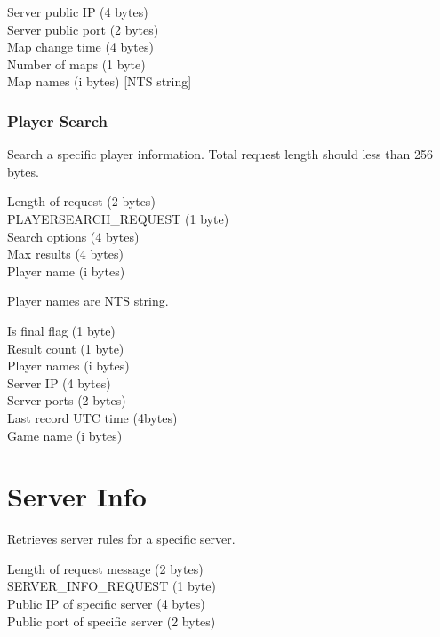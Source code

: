 \documentclass[oneside,titlepage,a4paper]{Definition/retrospy} %
\begin{document}
\ServerResponse
\begin{mybox}
	Server public IP (4 bytes)\\
	Server public port (2 bytes)\\
	Map change time (4 bytes)\\
	Number of maps (1 byte)\\
	Map names (i bytes) [NTS string]
\end{mybox}

\subsection{Player Search}
Search a specific player information.
\ClientRequest
Total request length should less than 256 bytes.
\begin{mybox}
	Length of request (2 bytes)\\
	PLAYERSEARCH\_REQUEST (1 byte)\\
	Search options (4 bytes)\\
	Max results (4 bytes)\\
	Player name (i bytes)
\end{mybox}

\ServerResponse
Player names are NTS string.
\begin{mybox}
	Is final flag (1 byte)\\
	Result count (1 byte)\\
	Player names (i bytes)\\
	Server IP (4 bytes)\\
	Server ports (2 bytes)\\
	Last record UTC time (4bytes)\\
	Game name (i bytes)
\end{mybox}

\chapter{Server Info}
Retrieves server rules for a specific server.
\ClientRequest
\begin{mybox}
	Length of request message (2 bytes)\\
	SERVER\_INFO\_REQUEST (1 byte)\\
	Public IP of specific server (4 bytes)\\
	Public port of specific server (2 bytes)\\
\end{mybox}

\ServerResponse

\begin{mybox}
	
\end{mybox}
\end{document}
